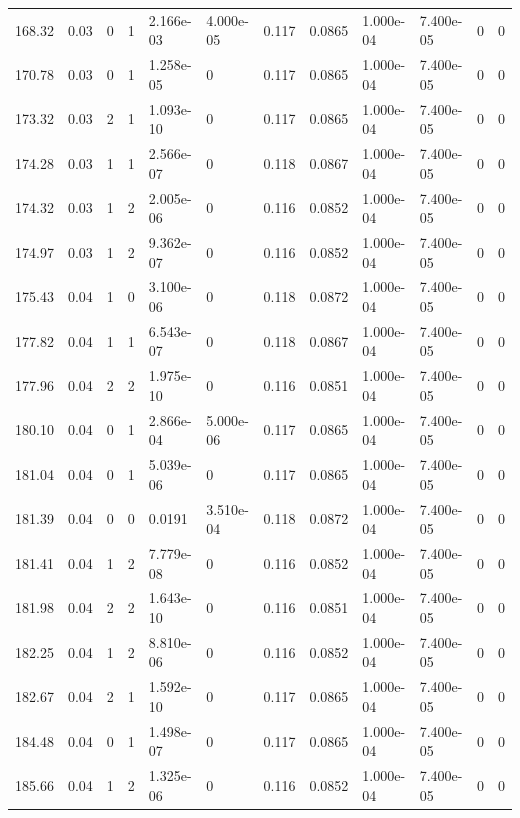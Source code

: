\documentclass[preview]{standalone}
\begin{document}
{{{{{\begin{tabular}{L{1.2cm}C{1.2cm} C{0.3cm}C{0.5cm} C{1.4cm}C{1.4cm} C{1.4cm}C{1.4cm} C{1.6cm}C{1.6cm} C{1.6cm}C{1.6cm}}
  168.32  &  0.03  & 0     &  1 &  2.166e-03  & 4.000e-05  &  0.117&   0.0865& 1.000e-04 & 7.400e-05   &  0 & 0  \\ 
  170.78  &  0.03  & 0     &  1 &  1.258e-05  & 0  &  0.117&   0.0865& 1.000e-04 & 7.400e-05   &  0 & 0  \\ 
  173.32  &  0.03  & 2     &  1 &  1.093e-10  & 0  &  0.117&   0.0865& 1.000e-04 & 7.400e-05   &  0 & 0  \\ 
  174.28  &  0.03  & 1     &  1 &  2.566e-07  & 0  &  0.118&   0.0867& 1.000e-04 & 7.400e-05   &  0 & 0  \\ 
  174.32  &  0.03  & 1     &  2 &  2.005e-06  & 0  &  0.116&   0.0852& 1.000e-04 & 7.400e-05   &  0 & 0  \\ 
  174.97  &  0.03  & 1     &  2 &  9.362e-07  & 0  &  0.116&   0.0852& 1.000e-04 & 7.400e-05   &  0 & 0  \\ 
  175.43  &  0.04  & 1     &  0 &  3.100e-06  & 0  &  0.118&   0.0872& 1.000e-04 & 7.400e-05   &  0 & 0  \\ 
  177.82  &  0.04  & 1     &  1 &  6.543e-07  & 0  &  0.118&   0.0867& 1.000e-04 & 7.400e-05   &  0 & 0  \\ 
  177.96  &  0.04  & 2     &  2 &  1.975e-10  & 0  &  0.116&   0.0851& 1.000e-04 & 7.400e-05   &  0 & 0  \\ 
  180.10  &  0.04  & 0     &  1 &  2.866e-04  & 5.000e-06  &  0.117&   0.0865& 1.000e-04 & 7.400e-05   &  0 & 0  \\ 
  181.04  &  0.04  & 0     &  1 &  5.039e-06  & 0  &  0.117&   0.0865& 1.000e-04 & 7.400e-05   &  0 & 0  \\ 
  181.39  &  0.04  & 0     &  0 &  0.0191  & 3.510e-04  &  0.118&   0.0872& 1.000e-04 & 7.400e-05   &  0 & 0  \\ 
  181.41  &  0.04  & 1     &  2 &  7.779e-08  & 0  &  0.116&   0.0852& 1.000e-04 & 7.400e-05   &  0 & 0  \\ 
  181.98  &  0.04  & 2     &  2 &  1.643e-10  & 0  &  0.116&   0.0851& 1.000e-04 & 7.400e-05   &  0 & 0  \\ 
  182.25  &  0.04  & 1     &  2 &  8.810e-06  & 0  &  0.116&   0.0852& 1.000e-04 & 7.400e-05   &  0 & 0  \\ 
  182.67  &  0.04  & 2     &  1 &  1.592e-10  & 0  &  0.117&   0.0865& 1.000e-04 & 7.400e-05   &  0 & 0  \\ 
  184.48  &  0.04  & 0     &  1 &  1.498e-07  & 0  &  0.117&   0.0865& 1.000e-04 & 7.400e-05   &  0 & 0  \\ 
  185.66  &  0.04  & 1     &  2 &  1.325e-06  & 0  &  0.116&   0.0852& 1.000e-04 & 7.400e-05   &  0 & 0  \\ 

\end{tabular}}}}}}
\end{document}
